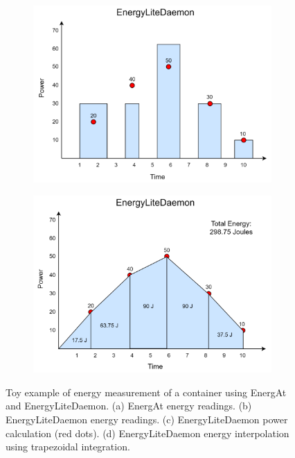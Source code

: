\documentclass[times, 10pt,twocolumn]{article}
\begin{document}
\begin{figure}[ht]
\begin{subfigure}[b]{0.24\textwidth}
         \centering
         \includegraphics[width=\textwidth]{imgs/EnergyLiteDaemon_Energy_2.png}
         \caption{}
         \label{fig:c}
   \end{subfigure}
   \hfill
   \begin{subfigure}[b]{0.24\textwidth} %
         \centering
         \includegraphics[width=\textwidth]{imgs/EnergyLiteDaemon_Energy_3.png}
         \caption{}
         \label{fig:d}
   \end{subfigure}
   
   \caption{Toy example of energy measurement of a container using EnergAt and EnergyLiteDaemon. (a) EnergAt energy readings. (b) EnergyLiteDaemon energy readings. (c) EnergyLiteDaemon power calculation (red dots). (d) EnergyLiteDaemon energy interpolation using trapezoidal integration.}
   \label{fig:energy_toy_example}
\end{figure}
\end{document}
